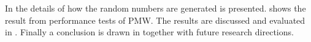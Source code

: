 In  the details of how the random numbers are generated is presented.
 shows the result from performance tests of PMW.
The results are discussed and evaluated in .
Finally a conclusion is drawn in  together with future research directions.

